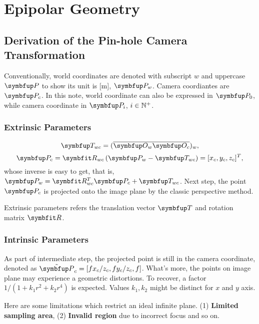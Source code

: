 \section{Epipolar Geometry}
\subsection{Derivation of the Pin-hole Camera Transformation}
Conventionally, world coordinates are denoted with subscript $w$ and uppercase $\Vect{P}$ to show its unit is [m], $\Vect{P}_w$. Camera coordiantes are $\Vect{P}_c$. In this note, world coordinate  can also be expressed in $\Vect{P}_0$, while camera coordinate in $\Vect{P}_i$, $i\in {\mathbb{N}}^+$.

\subsubsection{Extrinsic Parameters}
\begin{equation}
\Vect{T}_{wc} = (\overline{\Vect{O}_w \Vect{O}_c})_w,
\end{equation}
\begin{equation}
\Vect{P}_{\mathrm{c}}=\Matr{R}_{wc}  \left(\Vect{P}_{w}-\Vect{T}_{wc}\right)=[x_{c},y_c,z_c]^T,
\end{equation}
whose inverse is easy to get, that is, $\Vect{P}_{w}=\Matr{R}^{T}_{wc} \Vect{P}_{c}+\Vect{T}_{wc}$. Next step, the point $\Vect{P}_c$ is projected onto the image plane by the classic perspective method. 

\begin{definition}
Extrinsic parameters refers the translation vector $\Vect{T}$ and rotation matrix $\Matr{R}$.
\end{definition}

\subsubsection{Intrinsic Parameters}

As part of intermediate step, the projected point is still in the camera coordinate, denoted as $\tilde{\Vect{P}}_c=[f x_c/z_c, f  y_c/z_c, f]$. What's more, the points on image plane may experience a geometric distortions. To recover, a factor $1/(1+k_1 r^2+k_2 r^4)$ is expected.
Values $k_1, k_2$ might be distinct for $x$ and $y$ axis. 

Here are some limitations which restrict an ideal infinite plane. (1) \textbf{Limited sampling area}, (2) \textbf{Invalid region} due to incorrect focus and so on. 


